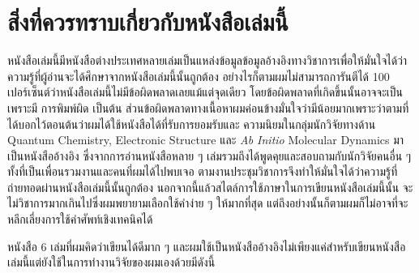 

{

\chapter*{\centering สิ่งที่ควรทราบเกี่ยวกับหนังสือเล่มนี้}

หนังสือเล่มนี้มีหนังสือต่างประเทศหลายเล่มเป็นแหล่งข้อมูลข้อมูลอ้างอิงทางวิชาการเพื่อให้มั่นใจได้ว่าความรู้ที่ผู้อ่านจะได้ศึกษาจากหนังสือเล่มนี้นั้นถูกต้อง
อย่างไรก็ตามผมไม่สามารถการันตีได้ 100 เปอร์เซ็นต์ว่าหนังสือเล่มนี้ไม่มีข้อผิดพลาดเลยแม้แต่จุดเดียว โดยข้อผิดพลาดที่เกิดขึ้นนั้นอาจจะเป็นเพราะมี%
การพิมพ์ผิด เป็นต้น ส่วนข้อผิดพลาดทางเนื้อหาผมค่อนข้างมั่นใจว่ามีน้อยมากเพราะว่าตามที่ได้บอกไว้ตอนต้นว่าผมได้ใช้หนังสือได้ที่รับการยอมรับและ%
ความนิยมในกลุ่มนักวิจัยทางด้าน Quantum Chemistry, Electronic Structure และ \textit{Ab Initio} Molecular Dynamics 
มาเป็นหนังสืออ้างอิง ซึ่งจากการอ่านหนังสือหลาย ๆ เล่มรวมถึงได้พูดคุยและสอบถามกับนักวิจัยคนอื่น ๆ ทั้งที่เป็นเพื่อนรวมงานและคนที่ผมได้ไปพบเจอ%
ตามงานประชุมวิชาการจึงทำให้มั่นใจได้ว่าความรู้ที่ถ่ายทอดผ่านหนังสือเล่มนี้นั้นถูกต้อง นอกจากนี้แล้วสไตล์การใช้ภาษาในการเขียนหนังสือเล่มนี้นั้น%
จะไม่วิชาการมากเกินไปซึ่งผมพยายามเลือกใช้คำง่าย ๆ ให้มากที่สุด แต่ถึงอย่างนั้นก็ตามผมก็ไม่อาจที่จะหลีกเลี่ยงการใช้คำศัพท์เชิงเทคนิคได้

หนังสือ 6 เล่มที่ผมคิดว่าเขียนได้ดีมาก ๆ และผมใช้เป็นหนังสืออ้างอิงไม่เพียงแค่สำหรับเขียนหนังสือเล่มนี้แต่ยังใช้ในการทำงานวิจัยของผมเองด้วยมีดังนี้

}
